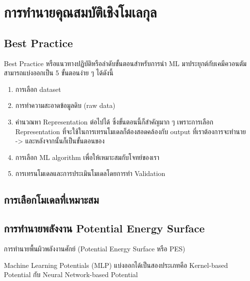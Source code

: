 

\chapter{การทำนายคุณสมบัติเชิงโมเลกุล}
\label{ch:predict_molprop}

\section{Best Practice}

Best Practice หรือแนวทางปฏิบัติหรือลำดับขั้นตอนสำหรับการนำ ML มาประยุกต์กับเคมีควอนตัมสามารถแบ่งออกเป็น 5 ขั้นตอนง่าย ๆ ได้ดังนี้

\begin{enumerate}
    \item การเลือก dataset
    \item การทำความสะอาดข้อมูลดิบ (raw data)
    \item คำนวณหา Representation ต่อไปได้ ซึ่งขั้นตอนนี้ก็สำคัญมาก ๆ เพราะการเลือก Representation 
    ที่จะใช้ในการเทรนโมเดลก็ต้องสอดคล้องกับ output ที่เราต้องการจะทำนาย -> และหลังจากนั้นก็เป็นขั้นตอนของ
    \item การเลือก ML algorithm เพื่อให้เหมาะสมกับโจทย์ของเรา 
    \item การเทรนโมเดลและการประเมินโมเดลโดยการทำ Validation
\end{enumerate}

\section{การเลือกโมเดลที่เหมาะสม}

\section{การทำนายพลังงาน Potential Energy Surface}

การทำนายพื้นผิวพลังงานศักย์ (Potential Energy Surface หรือ PES)

Machine Learning Potentials (MLP) แบ่งออกได้เป็นสองประเภทคือ Kernel-based Potential กับ Neural Network-based Potential

